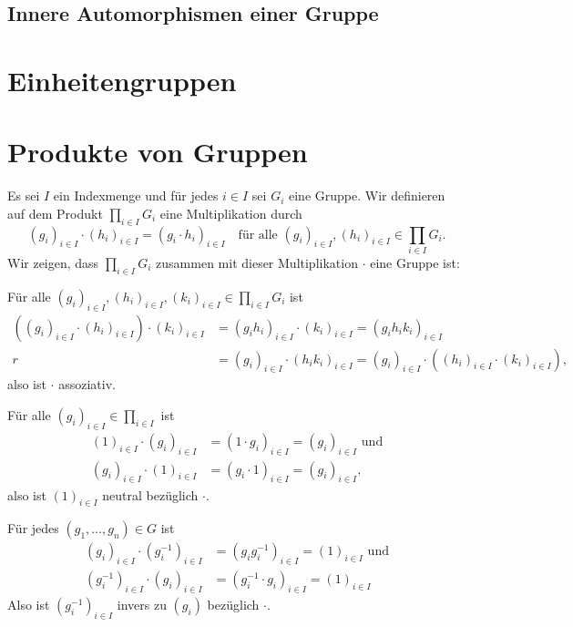 \subsection{Innere Automorphismen einer Gruppe}





\section{Einheitengruppen}





\section{Produkte von Gruppen}\label{sec: product of groups}

Es sei $I$ ein Indexmenge und für jedes $i \in I$ sei $G_i$ eine Gruppe. Wir definieren auf dem Produkt $\prod_{i \in I} G_i$ eine Multiplikation durch
\[
 (g_i)_{i \in I} \cdot (h_i)_{i \in I}
 = (g_i \cdot h_i)_{i \in I}
 \quad
 \text{für alle $(g_i)_{i \in I}, (h_i)_{i \in I} \in \prod_{i \in I} G_i$}.
\]
Wir zeigen, dass $\prod_{i \in I} G_i$ zusammen mit dieser Multiplikation $\cdot$ eine Gruppe ist:

Für alle $(g_i)_{i \in I}, (h_i)_{i \in I}, (k_i)_{i \in I} \in \prod_{i \in I} G_i$ ist
\begin{align*}
 ( (g_i)_{i \in I} \cdot (h_i)_{i \in I} ) \cdot (k_i)_{i \in I}
 &= (g_i h_i)_{i \in I} \cdot (k_i)_{i \in I}
 = (g_i h_i k_i)_{i \in I} \\r
 &= (g_i)_{i \in I} \cdot (h_i k_i)_{i \in I}
 = (g_i)_{i \in I} \cdot ( (h_i)_{i \in I} \cdot (k_i)_{i \in I} ),
\end{align*}
also ist $\cdot$ assoziativ.

Für alle $(g_i)_{i \in I} \in \prod_{i \in I}$ ist
\begin{align*}
 (1)_{i \in I} \cdot (g_i)_{i \in I}
 &= (1 \cdot g_i)_{i \in I}
 = (g_i)_{i \in I}
 \text{ und} \\
 (g_i)_{i \in I} \cdot (1)_{i \in I}
 &= (g_i \cdot 1)_{i \in I}
 = (g_i)_{i \in I},
\end{align*}
also ist $(1)_{i \in I}$ neutral bezüglich $\cdot$.

Für jedes $(g_1, \dotsc, g_n) \in G$ ist
\begin{align*}
 (g_i)_{i \in I} \cdot (g_i^{-1})_{i \in I}
 &= (g_i g_i^{-1})_{i \in I}
 = (1)_{i \in I} \text{ und} \\
 (g_i^{-1})_{i \in I} \cdot (g_i)_{i \in I}
 &= (g_i^{-1} \cdot g_i)_{i \in I}
 = (1)_{i \in I}
\end{align*}
Also ist $(g_i^{-1})_{i \in I}$ invers zu $(g_i)$ bezüglich $\cdot$.

